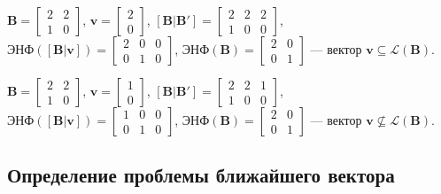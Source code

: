 $ \mathbf{B} = \left[\begin{array}{cccc}
2 & 2 \\
1 & 0
\end{array}\right] $, 
$ \mathbf{v} = \left[\begin{array}{cccc}
2 \\
0
\end{array}\right] $, 
$ \left[\mathbf{B} | \mathbf{B}'\right] = \left[\begin{array}{cccc}
2 & 2 & 2 \\
1 & 0 & 0
\end{array}\right] $, 
$ \text{ЭНФ}(\left[\mathbf{B} | \mathbf{v} \right]) = \left[\begin{array}{cccc}
2 & 0 & 0 \\
0 & 1 & 0
\end{array}\right] $,
$ \text{ЭНФ}(\mathbf{B}) = \left[\begin{array}{cccc}
2 & 0 \\
0 & 1
\end{array}\right] $ --- вектор $ \mathbf{v} \subseteq \mathcal{L}(\mathbf{B}) $.


$ \mathbf{B} = \left[\begin{array}{cccc}
2 & 2 \\
1 & 0
\end{array}\right] $, 
$ \mathbf{v} = \left[\begin{array}{cccc}
1 \\
0
\end{array}\right] $, 
$ \left[\mathbf{B} | \mathbf{B}'\right] = \left[\begin{array}{cccc}
2 & 2 & 1 \\
1 & 0 & 0
\end{array}\right] $, 
$ \text{ЭНФ}(\left[\mathbf{B} | \mathbf{v} \right]) = \left[\begin{array}{cccc}
1 & 0 & 0 \\
0 & 1 & 0
\end{array}\right] $,
$ \text{ЭНФ}(\mathbf{B}) = \left[\begin{array}{cccc}
2 & 0 \\
0 & 1
\end{array}\right] $ --- вектор $ \mathbf{v} \not \subseteq \mathcal{L}(\mathbf{B}) $.

\subsection{Определение проблемы ближайшего вектора}

